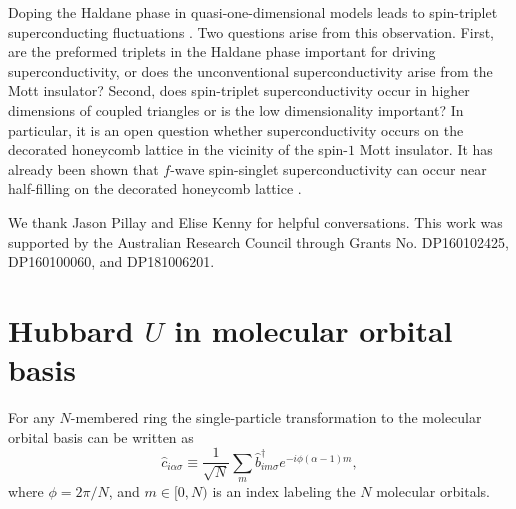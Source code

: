 \documentclass[reprint,aps,prb,amsmath,amssymb]{revtex4-2}
\begin{document}
Doping the Haldane phase in quasi-one-dimensional models leads to spin-triplet superconducting fluctuations \cite{Reja2019}. Two questions arise from this observation. First, are the preformed triplets in the Haldane phase important for driving superconductivity, or does the unconventional superconductivity arise from the Mott insulator? Second, does spin-triplet superconductivity occur in higher dimensions of coupled triangles or is the low dimensionality important? In particular, it is an open question whether superconductivity occurs on the decorated honeycomb lattice in the vicinity of the spin-$1$ Mott insulator. It has already been shown that $f$-wave spin-singlet superconductivity can occur near half-filling on the decorated honeycomb lattice \cite{Merino2021}.

\begin{acknowledgments}
	We thank Jason Pillay and Elise Kenny for helpful conversations. This work was supported by the Australian Research Council through Grants No. DP160102425, DP160100060, and DP181006201.
\end{acknowledgments}

\appendix

\section{Hubbard $U$ in molecular orbital basis} \label{sec:app-local}

For any $N$-membered ring the single-particle transformation to the molecular orbital basis can be written as
%
\begin{equation}
\hat{c}_{i\alpha \sigma} \equiv \frac{1}{\sqrt{N}} \sum_m \hat{b}_{im\sigma}^{\dagger} e^{-i \phi (\alpha - 1) m},
\end{equation}
%
where $\phi = 2\pi / N$, and $m \in [0,N)$ is an index labeling the $N$ molecular orbitals. 
\end{document}
